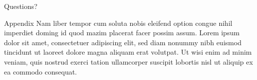 \documentclass[aspectratio=1610,12pt]{beamer}
\begin{document}
\begin{frame}
	Questions?
\end{frame}


\appendix
\begin{frame}{Appendix}
	Nam liber tempor cum soluta nobis eleifend option congue nihil imperdiet doming id quod mazim placerat facer possim assum. Lorem ipsum dolor sit amet, consectetuer adipiscing elit, sed diam nonummy nibh euismod tincidunt ut laoreet dolore magna aliquam erat volutpat. Ut wisi enim ad minim veniam, quis nostrud exerci tation ullamcorper suscipit lobortis nisl ut aliquip ex ea commodo consequat.
\end{frame}
\end{document}
